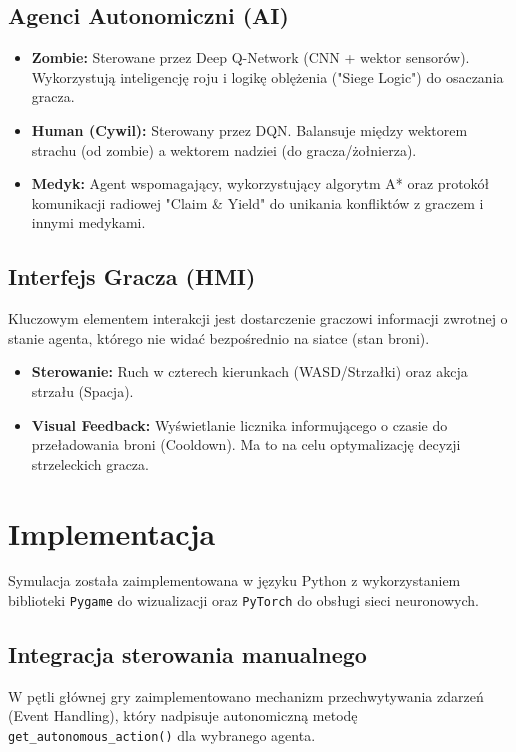 \documentclass[12pt,a4paper]{article}
\begin{document}
\subsection{Agenci Autonomiczni (AI)}
\begin{itemize}
    \item \textbf{Zombie:} Sterowane przez Deep Q-Network (CNN + wektor sensorów). Wykorzystują inteligencję roju i logikę oblężenia ("Siege Logic") do osaczania gracza.
    \item \textbf{Human (Cywil):} Sterowany przez DQN. Balansuje między wektorem strachu (od zombie) a wektorem nadziei (do gracza/żołnierza).
    \item \textbf{Medyk:} Agent wspomagający, wykorzystujący algorytm A* oraz protokół komunikacji radiowej "Claim \& Yield" do unikania konfliktów z graczem i innymi medykami.
\end{itemize}

\subsection{Interfejs Gracza (HMI)}
Kluczowym elementem interakcji jest dostarczenie graczowi informacji zwrotnej o
stanie agenta, którego nie widać bezpośrednio na siatce (stan broni).
\begin{itemize}
    \item \textbf{Sterowanie:} Ruch w czterech kierunkach (WASD/Strzałki) oraz akcja strzału (Spacja).
    \item \textbf{Visual Feedback:} Wyświetlanie licznika informującego o czasie do przeładowania broni (Cooldown). Ma to na celu optymalizację decyzji strzeleckich gracza.
\end{itemize}

\newpage

\section{Implementacja}

Symulacja została zaimplementowana w języku Python z wykorzystaniem biblioteki
\texttt{Pygame} do wizualizacji oraz \texttt{PyTorch} do obsługi sieci
neuronowych.

\subsection{Integracja sterowania manualnego}
W pętli głównej gry zaimplementowano mechanizm przechwytywania zdarzeń (Event
Handling), który nadpisuje autonomiczną metodę
\texttt{get\_autonomous\_action()} dla wybranego agenta.
\end{document}
